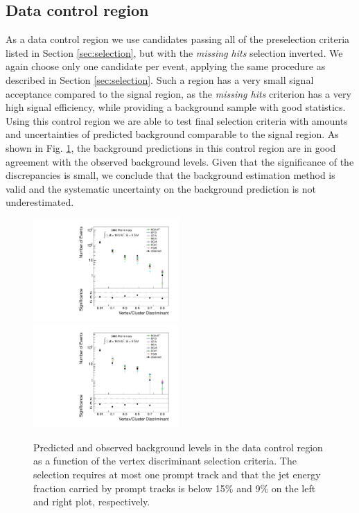 \subsection{Data control region}
\label{subsec:bkgCtrl}

As a data control region we use candidates passing all of the preselection criteria listed in Section
 \ref{sec:selection}, but with the {\it missing hits} selection inverted. We again choose only 
 one candidate per event, applying the same procedure as described in Section \ref{sec:selection}.
 Such a region has a very small 
signal acceptance compared to the signal region, as the {\it missing hits} criterion has a very high signal 
efficiency, while providing a
background sample with good statistics. Using this control region we are able to test final selection
criteria with amounts and uncertainties of predicted background comparable to the signal region. 
 As shown in Fig. \ref{fig:bkg_NMiss}, 
the background predictions in this control region are in good agreement 
with the observed background levels. Given that the significance
of the discrepancies is small, we conclude
that the background estimation method is valid and the systematic uncertainty on the background
 prediction is not underestimated.

\begin{figure}[htbp]
\centering
\includegraphics[width=0.495\textwidth]{plots/background/bkg_NMiss1.pdf}
\includegraphics[width=0.495\textwidth]{plots/background/bkg_NMiss2.pdf}
\caption{Predicted and observed background levels in the data control region as a function of the vertex
discriminant selection criteria. The selection requires at most one prompt track and that the jet energy fraction carried by prompt tracks is
below 15\% and 9\% on the left and right plot, respectively.\label{fig:bkg_NMiss}}
\end{figure}

